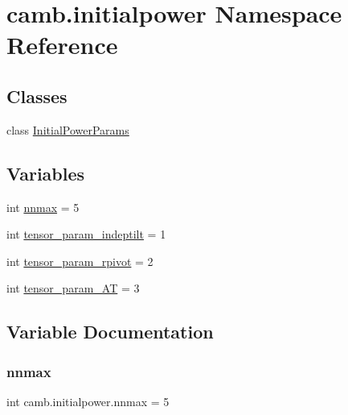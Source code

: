 \hypertarget{namespacecamb_1_1initialpower}{}\section{camb.\+initialpower Namespace Reference}
\label{namespacecamb_1_1initialpower}
\subsection*{Classes}
\begin{DoxyCompactItemize}
\item 
class \mbox{\hyperlink{classcamb_1_1initialpower_1_1InitialPowerParams}{Initial\+Power\+Params}}
\end{DoxyCompactItemize}
\subsection*{Variables}
\begin{DoxyCompactItemize}
\item 
int \mbox{\hyperlink{namespacecamb_1_1initialpower_a7012aed4483e6f9391ba3da06df906e3}{nnmax}} = 5
\item 
int \mbox{\hyperlink{namespacecamb_1_1initialpower_a4d2acbc11ff643f4cd196e59b6081762}{tensor\+\_\+param\+\_\+indeptilt}} = 1
\item 
int \mbox{\hyperlink{namespacecamb_1_1initialpower_a87e33284f7a24c1dc055e2518360a86a}{tensor\+\_\+param\+\_\+rpivot}} = 2
\item 
int \mbox{\hyperlink{namespacecamb_1_1initialpower_ad12f2e2184236421b74934eed1f5f93b}{tensor\+\_\+param\+\_\+\+AT}} = 3
\end{DoxyCompactItemize}


\subsection{Variable Documentation}
\mbox{\label{namespacecamb_1_1initialpower_a7012aed4483e6f9391ba3da06df906e3}} 
\subsubsection{\texorpdfstring{nnmax}{nnmax}}
{\footnotesize\ttfamily int camb.\+initialpower.\+nnmax = 5}


